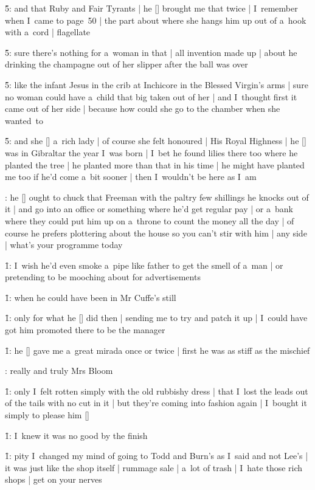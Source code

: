 \f5:
and that Ruby and Fair Tyrants |
he [\bloom] brought me that twice |
I~remember when I~came to page~50 |
the part about where she hangs him up out of a~hook with a~cord |
flagellate

\f5:
sure there's nothing for a~woman in that |
all invention made up |
about he drinking the champagne out of her slipper after the ball was over

\f5:
like the infant Jesus in the crib at Inchicore in the Blessed Virgin's arms |
sure no woman could have a~child that big taken out of her |
and I~thought first it came out of her side |
because how could she go to the chamber when she wanted~to

\f5:
and she [\mrslangtry] a~rich lady |
of course she felt honoured |
His Royal Highness |
he [\wales] was in Gibraltar the year I~was born |
I~bet he found lilies there too where he planted the tree |
he planted more than that in his time |
he might have planted me too if he'd come a~bit sooner |
then I~wouldn't be here as I~am

:
he [\bloom] ought to chuck that Freeman with the paltry few shillings he knocks out of it |
and go into an office or something where he'd get regular pay |
or a~bank where they could put him up on a~throne to count the money all the day |
of course he prefers plottering about the house so you can't stir with him |
any side |
what's your programme today

\f1:
I~wish he'd even smoke a~pipe like father to get the smell of a~man |
or pretending to be mooching about for advertisements

\f1:
when he could have been in Mr Cuffe's still

\f1:
only for what he [\bloom] did then |
sending me to try and patch it up |
I~could have got him promoted there to be the manager

\f1:
he [\cuffe] gave me a~great mirada once or twice |
first he was as stiff as the mischief

:
really and truly Mrs Bloom

\f1:
only I~felt rotten simply with the old rubbishy dress |
that I~lost the leads out of the tails with no cut in it |
but they're coming into fashion again |
I~bought it simply to please him [\bloom]

\f1:
I~knew it was no good by the finish

\f1:
pity I~changed my mind of going to Todd and Burn's as I~said and not Lee's |
it was just like the shop itself |
rummage sale |
a~lot of trash |
I~hate those rich shops |
get on your nerves

